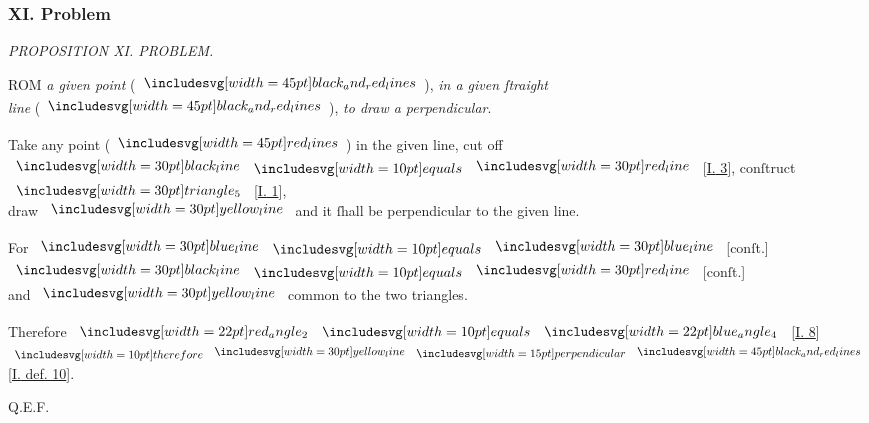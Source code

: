 \documentclass[12pt,preview]{standalone}
\begin{document}
\subsubsection{XI. Problem}

\begin{minipage}[t]{0.64\textwidth}
    \vspace{0pt}

    \begin{center}
        \textit{PROPOSITION XI. PROBLEM.}\label{book1pr11} \\
    \end{center}

    \hfill

    \begin{center}
        \raggedright \lettrine[lines=4, loversize=1, nindent=0pt]{}{}ROM \textit{a given point} (\hspace{-1ex}$\bimg{black_and_red_lines}$\hspace{-1ex}), \textit{in a given ſtraight\\ line} (\hspace{-1ex}$\bimg{black_and_red_lines}$\hspace{-1ex}), \textit{to draw a perpendicular}.
    \end{center}

    \hfill

    \hfill

    \hfill

    \begin{center}
        Take any point (\hspace{-1ex}$\bimg{red_lines}$\hspace{-1ex}) in the given line, cut off\\
        $\blackline \bequals \redline$ [\hyperref[book1pr3]{\textsc{I.} 3}], conſtruct $\img[0][0][30]{triangle_5}$ [\hyperref[book1pr1]{\textsc{I.} 1}],\\
        draw $\yellowline$ and it ſhall be perpendicular to the given line.
    \end{center}

    \hfill

    \hfill

    \begin{center}
        For $\blueline \bequals \blueline$ [conſt.] $\blackline \bequals \redline$ [conſt.]\\
        and $\yellowline$ common to the two triangles.
    \end{center}

    \hfill

    \begin{center}
        Therefore $\img[0][0][22]{red_angle_2} \bequals \img[0][0][22]{blue_angle_4}$ [\hyperref[book1pr8]{\textsc{I.} 8}]\\
        $\btherefore \yellowline \bperp \bimg{black_and_red_lines}$ [\hyperref[book1def10]{\textsc{I.} def. 10}].
    \end{center}

    \hfill

    \hfill Q.E.F.
\end{minipage}%
\hfill
\begin{minipage}[t]{0.33\textwidth}
    \vspace{40pt}
    
\end{minipage}
\end{document}
